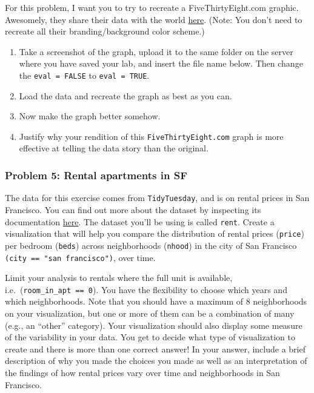 \documentclass[
]{article}
\begin{document}
For this problem, I want you to try to recreate a FiveThirtyEight.com
graphic. Awesomely, they share their data with the world
\href{https://data.fivethirtyeight.com/}{here}. (Note: You don't need to
recreate all their branding/background color scheme.)

\begin{enumerate}
\def\labelenumi{\alph{enumi}.}
\item
  Take a screenshot of the graph, upload it to the same folder on the
  server where you have saved your lab, and insert the file name below.
  Then change the \texttt{eval\ =\ FALSE} to \texttt{eval\ =\ TRUE}.
\item
  Load the data and recreate the graph as best as you can.
\item
  Now make the graph better somehow.
\item
  Justify why your rendition of this \texttt{FiveThirtyEight.com} graph
  is more effective at telling the data story than the original.
\end{enumerate}

\hypertarget{problem-5-rental-apartments-in-sf}{%
\subsubsection{Problem 5: Rental apartments in
SF}\label{problem-5-rental-apartments-in-sf}}

The data for this exercise comes from \texttt{TidyTuesday}, and is on
rental prices in San Francisco. You can find out more about the dataset
by inspecting its documentation
\href{https://github.com/rfordatascience/tidytuesday/tree/master/data/2022/2022-07-05}{here}.
The dataset you'll be using is called \texttt{rent}. Create a
visualization that will help you compare the distribution of rental
prices (\texttt{price}) per bedroom (\texttt{beds}) across neighborhoods
(\texttt{nhood}) in the city of San Francisco
\texttt{(city\ ==\ "san\ francisco")}, over time.

Limit your analysis to rentals where the full unit is available,
i.e.~(\texttt{room\_in\_apt\ ==\ 0}). You have the flexibility to choose
which years and which neighborhoods. Note that you should have a maximum
of 8 neighborhoods on your visualization, but one or more of them can be
a combination of many (e.g., an ``other'' category). Your visualization
should also display some measure of the variability in your data. You
get to decide what type of visualization to create and there is more
than one correct answer! In your answer, include a brief description of
why you made the choices you made as well as an interpretation of the
findings of how rental prices vary over time and neighborhoods in San
Francisco.
\end{document}
